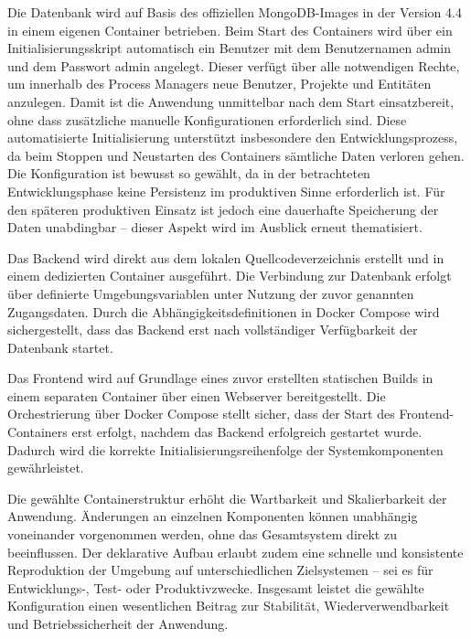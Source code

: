 Die Datenbank wird auf Basis des offiziellen MongoDB-Images in der Version 4.4 in einem eigenen Container betrieben. Beim Start des Containers wird über ein Initialisierungsskript automatisch ein Benutzer mit dem Benutzernamen admin und dem Passwort admin angelegt. Dieser verfügt über alle notwendigen Rechte, um innerhalb des Process Managers neue Benutzer, Projekte und Entitäten anzulegen. Damit ist die Anwendung unmittelbar nach dem Start einsatzbereit, ohne dass zusätzliche manuelle Konfigurationen erforderlich sind. Diese automatisierte Initialisierung unterstützt insbesondere den Entwicklungsprozess, da beim Stoppen und Neustarten des Containers sämtliche Daten verloren gehen. Die Konfiguration ist bewusst so gewählt, da in der betrachteten Entwicklungsphase keine Persistenz im produktiven Sinne erforderlich ist. Für den späteren produktiven Einsatz ist jedoch eine dauerhafte Speicherung der Daten unabdingbar – dieser Aspekt wird im Ausblick erneut thematisiert.

Das Backend wird direkt aus dem lokalen Quellcodeverzeichnis erstellt und in einem dedizierten Container ausgeführt. Die Verbindung zur Datenbank erfolgt über definierte Umgebungsvariablen unter Nutzung der zuvor genannten Zugangsdaten. Durch die Abhängigkeitsdefinitionen in Docker Compose wird sichergestellt, dass das Backend erst nach vollständiger Verfügbarkeit der Datenbank startet.

Das Frontend wird auf Grundlage eines zuvor erstellten statischen Builds in einem separaten Container über einen Webserver bereitgestellt. Die Orchestrierung über Docker Compose stellt sicher, dass der Start des Frontend-Containers erst erfolgt, nachdem das Backend erfolgreich gestartet wurde. Dadurch wird die korrekte Initialisierungsreihenfolge der Systemkomponenten gewährleistet.

Die gewählte Containerstruktur erhöht die Wartbarkeit und Skalierbarkeit der Anwendung. Änderungen an einzelnen Komponenten können unabhängig voneinander vorgenommen werden, ohne das Gesamtsystem direkt zu beeinflussen. Der deklarative Aufbau erlaubt zudem eine schnelle und konsistente Reproduktion der Umgebung auf unterschiedlichen Zielsystemen – sei es für Entwicklungs-, Test- oder Produktivzwecke. Insgesamt leistet die gewählte Konfiguration einen wesentlichen Beitrag zur Stabilität, Wiederverwendbarkeit und Betriebssicherheit der Anwendung.
























